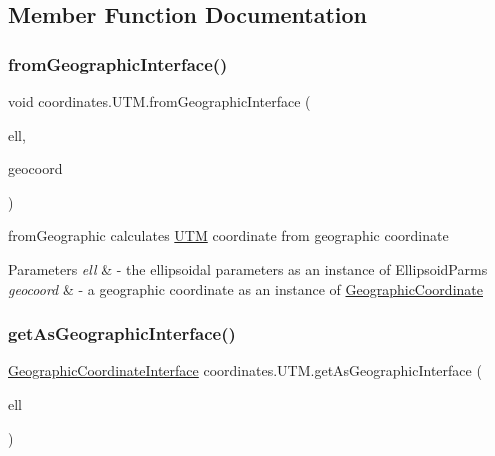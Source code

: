 \subsection{Member Function Documentation}
\mbox{\label{classcoordinates_1_1_u_t_m_a8ce35fab81c41da52a3e006dd37c48b5}} 
\subsubsection{\texorpdfstring{from\+Geographic\+Interface()}{fromGeographicInterface()}}
{\footnotesize\ttfamily void coordinates.\+U\+T\+M.\+from\+Geographic\+Interface (\begin{DoxyParamCaption}\item[{\hyperlink{classparams_1_1_ellipsoid_parms}{Ellipsoid\+Parms}}]{ell,  }\item[{\hyperlink{classcoordinates_1_1_geographic_coordinate_interface}{Geographic\+Coordinate\+Interface}}]{geocoord }\end{DoxyParamCaption})}



from\+Geographic calculates \hyperlink{classcoordinates_1_1_u_t_m}{U\+TM} coordinate from geographic coordinate 


\begin{DoxyParams}{Parameters}
{\em ell} & -\/ the ellipsoidal parameters as an instance of Ellipsoid\+Parms \\
\hline
{\em geocoord} & -\/ a geographic coordinate as an instance of \hyperlink{classcoordinates_1_1_geographic_coordinate}{Geographic\+Coordinate} \\
\hline
\end{DoxyParams}
\mbox{\label{classcoordinates_1_1_u_t_m_a007d51832fcdc5eb721f04f23d4be8f9}} 
\subsubsection{\texorpdfstring{get\+As\+Geographic\+Interface()}{getAsGeographicInterface()}}
{\footnotesize\ttfamily \hyperlink{classcoordinates_1_1_geographic_coordinate_interface}{Geographic\+Coordinate\+Interface} coordinates.\+U\+T\+M.\+get\+As\+Geographic\+Interface (\begin{DoxyParamCaption}\item[{\hyperlink{classparams_1_1_ellipsoid_parms}{Ellipsoid\+Parms}}]{ell }\end{DoxyParamCaption})}



